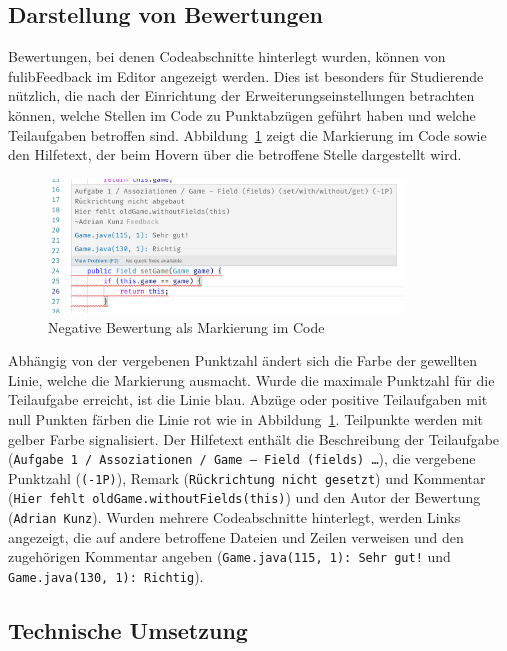 \subsection{Darstellung von Bewertungen}

Bewertungen, bei denen Codeabschnitte hinterlegt wurden, können von fulibFeedback im Editor angezeigt werden.
Dies ist besonders für Studierende nützlich, die nach der Einrichtung der Erweiterungseinstellungen betrachten können, welche Stellen im Code zu Punktabzügen geführt haben und welche Teilaufgaben betroffen sind.
Abbildung~\ref{fig:fulibFeedback-negative} zeigt die Markierung im Code sowie den Hilfetext, der beim Hovern über die betroffene Stelle dargestellt wird.

\begin{figure}
    \centering
    \includegraphics[width=0.84\textwidth]{images/fulibFeedback-negative}
    \caption{Negative Bewertung als Markierung im Code}
    \label{fig:fulibFeedback-negative}
\end{figure}

Abhängig von der vergebenen Punktzahl ändert sich die Farbe der gewellten Linie, welche die Markierung ausmacht.
Wurde die maximale Punktzahl für die Teilaufgabe erreicht, ist die Linie blau.
Abzüge oder positive Teilaufgaben mit null Punkten färben die Linie rot wie in Abbildung~\ref{fig:fulibFeedback-negative}.
Teilpunkte werden mit gelber Farbe signalisiert.
Der Hilfetext enthält die Beschreibung der Teilaufgabe (\texttt{Aufgabe 1 / Assoziationen / Game -- Field (fields) \dots}), die vergebene Punktzahl (\texttt{(-1P)}), Remark (\texttt{Rückrichtung nicht gesetzt}) und Kommentar (\texttt{Hier fehlt oldGame.withoutFields(this)}) und den Autor der Bewertung (\texttt{Adrian Kunz}).
Wurden mehrere Codeabschnitte hinterlegt, werden Links angezeigt, die auf andere betroffene Dateien und Zeilen verweisen und den zugehörigen Kommentar angeben (\texttt{Game.java(115, 1): Sehr gut!} und \texttt{Game.java(130, 1): Richtig}).

\subsection{Technische Umsetzung}\label{subsec:fulibFeedback-tech}

